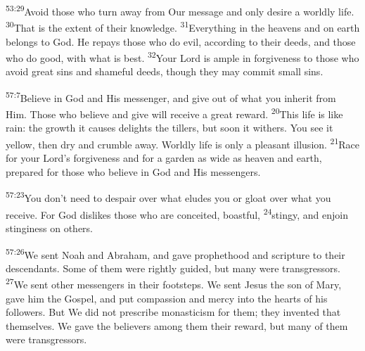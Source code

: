 \documentclass[openany,12pt,english]{book}
\newenvironment{para}{\par\pretolerance=100\tolerance=200\setlength{\emergencystretch}{0.6em}\relax}{\par}
\begin{document}
\bigskip{}

\begin{para}
    \textsuperscript{53:29}\thinspace{}A\-void those who turn a\-way from Our mes\-sage and on\-ly de\-sire a world\-ly life.
    \textsuperscript{30}\thinspace{}That is the ex\-tent of their knowl\-edge.
    \textsuperscript{31}\thinspace{}Eve\-ry\-thing in the heavens and on earth belongs to God. He repays those who do evil, ac\-cord\-ing to their deeds, and those who do good, with what is best.
    \textsuperscript{32}\thinspace{}Your Lord is am\-ple in for\-give\-ness to those who a\-void great sins and shame\-ful deeds, though they may com\-mit small sins.
\end{para}

\bigskip{}

\begin{para}
    \textsuperscript{57:7}\thinspace{}Be\-lieve in God and His mes\-sen\-ger, and give out of what you in\-her\-it from Him. Those who be\-lieve and give will re\-ceive a great re\-ward. 
    \textsuperscript{20}\thinspace{}This life is like rain: the growth it causes delights the tillers, but soon it with\-ers. You see it yel\-low, then dry and crum\-ble a\-way. World\-ly life is on\-ly a pleas\-ant il\-lu\-sion.
    \textsuperscript{21}\thinspace{}Race for your Lord's for\-give\-ness and for a gar\-den as wide as heav\-en and earth, pre\-pared for those who be\-lieve in God and His messengers.
\end{para}

\begin{para}
    \textsuperscript{57:23}\thinspace{}You don't need to des\-pair o\-ver what eludes you or gloat o\-ver what you re\-ceive. For God dislikes those who are con\-ceit\-ed, boast\-ful,
    \textsuperscript{24}\thinspace{}sting\-y, and en\-join stin\-gi\-ness on others.
\end{para}

\begin{para}
    \textsuperscript{57:26}\thinspace{}We sent No\-ah and Abraham, and gave prophethood and scrip\-ture to their descendants. Some of them were right\-ly guid\-ed, but man\-y were transgressors.
    \textsuperscript{27}\thinspace{}We sent oth\-er messengers in their footsteps. We sent Jesus the son of Mar\-y, gave him the Gos\-pel, and put com\-pas\-sion and mer\-cy in\-to the hearts of his followers. But We did not pre\-scribe mo\-nas\-ti\-cism for them; they invented that them\-selves. We gave the believers a\-mong them their re\-ward, but man\-y of them were transgressors.
\end{para}
\end{document}
